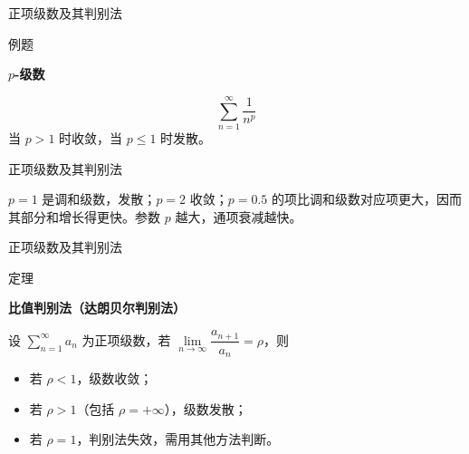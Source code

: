 \documentclass[aspectratio=169,10pt,fontset=fandol]{ctexbeamer}
\newenvironment{custom}[1]{\par\noindent\textbf{#1}\quad}{\par\vspace{0.8em}}
\begin{document}
\begin{frame}[t,fragile]{正项级数及其判别法}
\footnotesize
\begin{block}{例题}
{\footnotesize
\textbf{\(p\)-级数}\par

\[
\sum_{n=1}^{\infty} \dfrac{1}{n^p}
\]
当 \(p > 1\) 时收敛，当 \(p \leq 1\) 时发散。

}
\end{block}
\end{frame}
\begin{frame}[t,fragile]{正项级数及其判别法}
\footnotesize
{\footnotesize
\(p=1\) 是调和级数，发散；\(p=2\) 收敛；\(p=0.5\) 的项比调和级数对应项更大，因而其部分和增长得更快。参数 \(p\) 越大，通项衰减越快。

}
\end{frame}
\begin{frame}[t,fragile]{正项级数及其判别法}
\footnotesize
\begin{block}{定理}
{\footnotesize
\textbf{比值判别法（达朗贝尔判别法）}\par

设 \(\sum\limits_{n = 1}^{  \infty }a_n\) 为正项级数，若 \(\lim\limits_{n\to\infty}\dfrac{a_{n+1}}{a_n}=\rho\)，则
\begin{itemize}
\item 若 \(\rho < 1\)，级数收敛；
\item 若 \(\rho > 1\)（包括 \(\rho = +\infty\)），级数发散；
\item 若 \(\rho = 1\)，判别法失效，需用其他方法判断。
\end{itemize}

}
\end{block}
\end{frame}
\end{document}
